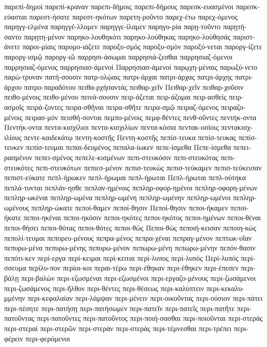 {παρεπί-δημοί
παρεπί-κραναν
παρεπι-δήμοις
παρεπι-δήμους
παρεσκ-ευασμένοι
παρεσκ-εύασται
παρεστ-ήσατε
παρεστ-ηκότων
παρετη-ροῦντο
παρεχ-έτω
παρεχ-όμενος
παρηγγ-ελμένα
παρηγγέ-λλομεν
παρηγγε-ίλαμεν
παρηγο-ρία
παρῃ-τοῦντο
παρῃτή-σαντο
παρῃτη-μένον
παρηκο-λουθηκότι
παρηκο-λούθηκας
παρηκο-λούθησάς
παριστ-άνετε
παροι-μίαις
παρομο-ιάζετε
παροξυ-σμός
παροξυ-σμὸν
παροξύ-νεται
παροργ-ίζετε
παροργ-ισμῷ
παροργ-ιῶ
παρρησι-άσωμαι
παρρησιά-ζεσθαι
παρρησιαζ-όμενοι
παρρησιαζ-όμενος
παρρησιασ-άμενοί
Παρρησιασ-άμενοί
παρῳχη-μέναις
παρωξύ-νετο
παρώ-τρυναν
πατή-σουσιν
πατρ-ολῴαις
πατρι-άρχαι
πατρι-άρχας
πατρι-άρχης
πατρι-άρχου
πατρο-παραδότου
πειθα-ρχήσαντάς
πειθαρ-χεῖν
Πειθαρ-χεῖν
πειθαρ-χοῦσιν
πειθο-μένοις
πειθο-μένου
πεινά-σουσιν
πειρ-άζεται
πειρ-άζομαι
πειρ-ασθείς
πειρ-ασμοῖς
πειρά-ζοντες
πειρα-σθῆναι
πειρα-σθῆτε
πειρα-σμῷ
πειραζ-όμενος
πειραζο-μένοις
πειρασ-μόν
πεισθή-σονται
πεμπο-μένοις
πεμφ-θέντες
πενθ-οῦντες
πεντήκ-οντα
Πεντήκ-οντα
πεντα-κισχίλιοι
πεντα-κισχιλίων
πεντα-κόσια
πεντακ-οσίοις
πεντακισχ-ιλίους
πεντε-καιδεκάτῳ
πεντη-κοστῆς
Πεντη-κοστῆς
πεπίσ-τευκα
πεπίσ-τευκας
πεπίσ-τευκεν
πεπίσ-τευμαι
πεπαι-δευμένος
πεπαλα-ίωκεν
πεπε-ίσμεθα
Πεπε-ίσμεθα
πεπει-ρασμένον
πεπει-σμένος
πεπελε-κισμένων
πεπι-στευκόσιν
πεπι-στευκότας
πεπι-στευκότες
πεπι-στευκότων
πεπιεσ-μένον
πεπισ-τευκὼς
πεπισ-τεύκαμεν
πεπισ-τεύκεισαν
πεπιστ-εύκατε
πεπλ-ήρωκεν
πεπλ-ήρωμαι
πεπλ-ήρωται
Πεπλ-ήρωται
πεπλ-ούτηκα
πεπλά-τυνται
πεπλάν-ησθε
πεπλαν-ημένοις
πεπληρ-οφορ-ημένοι
πεπληρ-οφορη-μένων
πεπληρ-ωκέναι
πεπληρ-ωμένα
πεπληρ-ωμένη
πεπληρ-ωμένην
πεπληρ-ωμένοι
πεπληρ-ωμένους
πεπληρ-ώκατε
πεποί-θαμεν
πεποί-θησιν
Πεποί-θησιν
πεποι-ήκαμεν
πεποι-ήκατε
πεποι-ηκέναι
πεποι-ηκόσιν
πεποι-ηκότες
πεποι-ηκότος
πεποι-ημένων
πεποι-θέναι
πεποι-θήσει
πεποι-θότας
πεποι-θότες
πεποι-θὼς
Πεποι-θὼς
πεποιή-κεισαν
πεποιη-κώς
πεπολί-τευμαι
πεπορευ-μένους
πεπρα-μένος
πεπρα-χέναι
πεπραγ-μένον
πεπτωκ-υῖαν
πεπυρω-μένα
πεπυρω-μένης
πεπυρω-μένον
πεπωρω-μένη
πεπωρω-μένην
πεπόν-θασιν
πεπότι-κεν
περί-εργα
περί-κειμαι
περί-κειται
περί-λυπος
περί-λυπός
Περί-λυπός
περί-σσευμα
περίλυ-πον
περίοι-κοι
περαι-τέρω
περι-έθηκαν
περι-έθηκεν
περι-έπεσεν
περι-βάλῃ
περι-βαλὼν
περι-εζωσμέναι
περι-εζωσμένοι
περι-εργαζο-μένους
περι-ζωσάμενοι
περι-ζωσάμενος
περι-ῆλθον
περι-θέντες
περι-θέσεως
περι-καλύπτειν
περι-κεκαλυ-μμένην
περι-κεφαλαίαν
περι-λάμψαν
περι-μένειν
περι-οικοῦντας
περι-ούσιον
περι-πάτει
περι-πέσητε
περι-πατήσῃ
περι-πατήσωμεν
περι-πατεῖν
περι-πατεῖς
περι-πατῆτε
περι-πατοῦντας
περι-πατοῦντες
περι-πατοῦντος
περι-ποιή-σασθαι
περι-ποιοῦνται
περι-στεράς
περι-στεραί
περι-στερῶν
περι-στερὰν
περι-στερὰς
περι-τέμνεσθαι
περι-τρέπει
περι-φέρειν
περι-φερόμενοι
}
